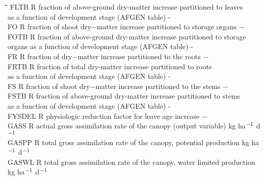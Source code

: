 \begin{tabbing}
\hspace{1.27cm}\=\hspace{1.27cm}\=\hspace{1.27cm}\=\hspace{1.27cm}\=%
\hspace{1.27cm}\=\hspace{1.27cm}\=\hspace{1.27cm}\=\hspace{1.27cm}\=%
\hspace{1.27cm}\=\hspace{1.27cm}\=\kill
FLTB\> \> R\> fraction of above-ground dry-matter increase partitioned to leaves\\
\>\> \> as a function of development stage (AFGEN table)\> \> \> \> \> \> \> -\\
FO      \> \> R   \> fraction of shoot dry$-$matter increase partitioned to storage organs\> \> \> \> \> \> \> $-$\\
FOTB\> \> R\> fraction of above-ground dry-matter increase partitioned to storage\\
\>\> \> organs as a function of development stage (AFGEN table)\> \> \> \> \> \> \> -\\
FR      \> \> R   \> fraction of dry$-$matter increase partitioned to the roots      \> \> \> \> \> \> \> $-$\\
FRTB\> \> R\> fraction of total dry-matter increase partitioned to roots\\
\>\> \> as a function of development stage (AFGEN table)\> \> \> \> \> \> \> -\\
FS      \> \> R   \> fraction of shoot dry$-$matter increase partitioned to the stems \> \> \> \> \> \> \> $-$\\
FSTB\> \> R\> fraction of above-ground dry-matter increase partitioned to stems\\
\>\> \> as a function of development stage (AFGEN table)\> \> \> \> \> \> \> -\\
FYSDEL  \> \> R   \> physiologic reduction factor for leave age increase            \> \> \> \> \> \> \> $-$\\
GASS\> \> R\> actual gross assimilation rate of the canopy (output variable)\> \> \> \> \> \> \> kg ha$^{{\rm -1}}$ d$^{{\rm -1}}$\\
GASPP\> \> R\> total gross assimilation rate of the canopy, potential production  \> \> \> \> \> \> \> kg ha$^{{\rm -1}}$ d$^{{\rm -1}}$\\
GASWL\> \> R\> total gross assimilation rate of the canopy, water limited production  \> \> \> \> \> \> \> kg ha$^{{\rm -1}}$ d$^{{\rm -1}}$\\

\end{tabbing}
